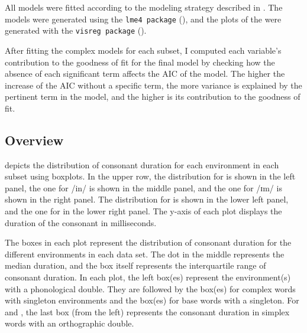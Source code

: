 All models were fitted according to the modeling strategy described in .  
The models were generated using the \texttt{lme4 package} (\citealt{Bates.2014}), and the plots of the  were generated with the \texttt{visreg package} (\citealt{Breheny.2015}). 

After fitting the complex models for each subset, I computed each variable's contribution to the goodness of fit for the final model by checking how the absence of each significant term affects the AIC of the model. The higher the increase of the AIC without a specific term, the more variance is explained by the pertinent term in the model, and the higher is its contribution to the goodness of fit.







\subsection{Overview}
	
 depicts the distribution of consonant duration for each environment in each subset using boxplots. In the upper row, the distribution for  is shown in the left panel, the one for /in/
is shown in the middle panel, and the one for /ɪm/ is shown in the right panel. The distribution for  is shown in the lower left panel, and the one for  in the lower right panel.
The y-axis of each plot displays the duration of the consonant in milliseconds. 

The boxes in each plot represent the distribution of consonant duration for the different environments in each data set. The dot in the middle represents the median duration, and the box itself represents the interquartile range of consonant duration. 
In each plot, the left box(es) represent the environment(s) with a phonological double. They are followed by the box(es) for  complex words with singleton environments and the box(es) for base words with a singleton. For  and , the last box (from the left) represents the consonant duration in simplex words with an orthographic double.




